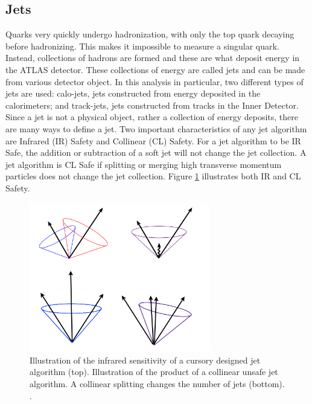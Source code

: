 \subsection{Jets}
Quarks very quickly undergo hadronization, with only the top quark decaying before hadronizing. This makes it impossible to measure a singular quark. Instead, collections of hadrons are formed and these are what deposit energy in the ATLAS detector. These collections of energy are called jets and can be made from various detector object. In this analysis in particular, two different types of jets are used: calo-jets, jets constructed from energy deposited in the calorimeters; and track-jets, jets constructed from tracks in the Inner Detector. \newline
\indent Since a jet is not a physical object, rather a collection of energy deposits, there are many ways to define a jet. Two important characteristics of any jet algorithm are Infrared (IR) Safety and Collinear (CL) Safety. For a jet algorithm to be IR Safe, the addition or subtraction of a soft jet will not change the jet collection. A jet algorithm is CL Safe if splitting or merging high transverse momentum particles does not change the jet collection. Figure \ref{fig:IR_CL} illustrates both IR and CL Safety.

\begin{figure}[h]
\begin{center}
\includegraphics*[width=0.70\textwidth] {figures/IR_CL_safe}
\caption{Illustration of the infrared sensitivity of a cursory designed jet algorithm (top). Illustration of the product of a collinear unsafe jet algorithm. A collinear splitting changes the number of jets (bottom). \cite{Isildak:2013kfa}.}
\label{fig:IR_CL}
\end{center}
\end{figure}

